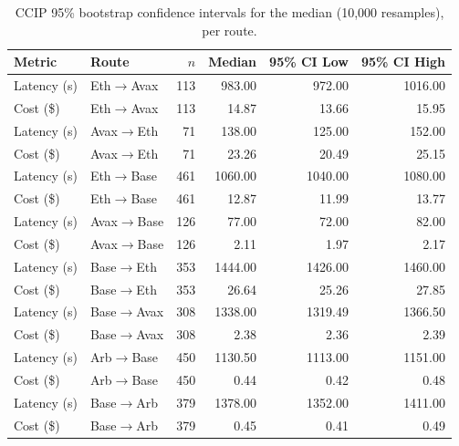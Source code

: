 \begin{table}[ht]
\caption{CCIP 95\% bootstrap confidence intervals for the median (10,000 resamples), per route.}
\label{table:ccip_bootstrap_ci}
\begingroup
\small
\setlength{\tabcolsep}{5pt}
\begin{tabular}{llrrrr}
\toprule
\textbf{Metric} & \textbf{Route} & $n$ & \textbf{Median} & \textbf{95\% CI Low} & \textbf{95\% CI High} \\
\midrule
Latency (s) & Eth$\to$Avax & 113 & 983.00 & 972.00 & 1016.00 \\
Cost (\$) & Eth$\to$Avax & 113 & 14.87 & 13.66 & 15.95 \\
Latency (s) & Avax$\to$Eth & 71 & 138.00 & 125.00 & 152.00 \\
Cost (\$) & Avax$\to$Eth & 71 & 23.26 & 20.49 & 25.15 \\
Latency (s) & Eth$\to$Base & 461 & 1060.00 & 1040.00 & 1080.00 \\
Cost (\$) & Eth$\to$Base & 461 & 12.87 & 11.99 & 13.77 \\
Latency (s) & Avax$\to$Base & 126 & 77.00 & 72.00 & 82.00 \\
Cost (\$) & Avax$\to$Base & 126 & 2.11 & 1.97 & 2.17 \\
Latency (s) & Base$\to$Eth & 353 & 1444.00 & 1426.00 & 1460.00 \\
Cost (\$) & Base$\to$Eth & 353 & 26.64 & 25.26 & 27.85 \\
Latency (s) & Base$\to$Avax & 308 & 1338.00 & 1319.49 & 1366.50 \\
Cost (\$) & Base$\to$Avax & 308 & 2.38 & 2.36 & 2.39 \\
Latency (s) & Arb$\to$Base & 450 & 1130.50 & 1113.00 & 1151.00 \\
Cost (\$) & Arb$\to$Base & 450 & 0.44 & 0.42 & 0.48 \\
Latency (s) & Base$\to$Arb & 379 & 1378.00 & 1352.00 & 1411.00 \\
Cost (\$) & Base$\to$Arb & 379 & 0.45 & 0.41 & 0.49 \\
\bottomrule
\end{tabular}
\endgroup
\end{table}
